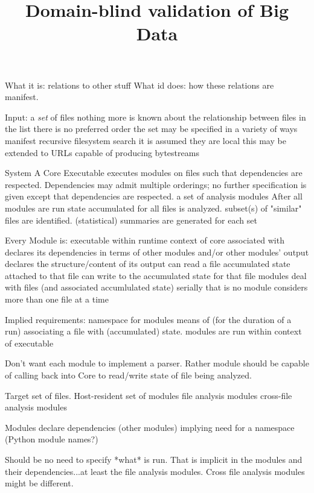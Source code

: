 \documentclass {article}
\begin{document}
\title{Domain-blind validation of Big Data}

\maketitle

What it is: relations to other stuff
What id does: how these relations are manifest.

Input:
	a \emph{set} of files
	nothing more is known about the relationship between files in the list
	there is no preferred order
	the set may be specified in a variety of ways
		manifest
		recursive filesystem search
	it is assumed they are local 
	this may be extended to URLs capable of producing bytestreams

System
	A Core Executable
	executes modules on files such that dependencies are respected.
	Dependencies may admit multiple orderings; no further specification
		is given except that dependencies are respected.
	a set of analysis modules
	After all modules are run state accumulated for all files is analyzed.
		subset(s) of "similar" files are identified.
		(statistical) summaries are generated for each set

	
Every Module is:
	executable within runtime context of core
	associated with
		declares its dependencies
			in terms of 
				other modules
				and/or other modules' output
		declares the structure/content of its output
	can read
		a file
		accumulated state attached to that file
	can write to the accumulated state for that file
	modules deal with files (and associated accumlulated state) serially
		that is no module considers more than one file at a time

Implied requirements:
	namespace for modules
	means of (for the duration of a run) associating a file with (accumulated) state.
	modules are run within context of executable

Don't want each module to implement a parser. Rather module should
be capable of calling back into Core to read/write state of file being
analyzed.

Target set of files.
Host-resident set of modules
	file analysis modules
	cross-file analysis modules

Modules declare dependencies (other modules)
	implying need for a namespace (Python module names?)

Should be no need to specify *what* is run. That is
	implicit in the modules and their dependencies...at least
	the file analysis modules.
	Cross file analysis modules might be different.
\end{document}
